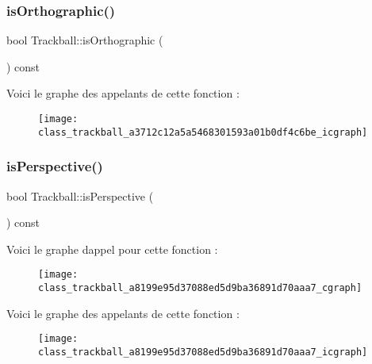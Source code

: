 \subsubsection{\texorpdfstring{is\+Orthographic()}{isOrthographic()}}
{\footnotesize\ttfamily bool Trackball\+::is\+Orthographic (\begin{DoxyParamCaption}{ }\end{DoxyParamCaption}) const}

Voici le graphe des appelants de cette fonction \+:
\nopagebreak
\begin{figure}[H]
\begin{center}
\leavevmode
\texttt{[image: class\_trackball\_a3712c12a5a5468301593a01b0df4c6be\_icgraph]}
\end{center}
\end{figure}
\mbox{\label{class_trackball_a8199e95d37088ed5d9ba36891d70aaa7}} 
\subsubsection{\texorpdfstring{is\+Perspective()}{isPerspective()}}
{\footnotesize\ttfamily bool Trackball\+::is\+Perspective (\begin{DoxyParamCaption}{ }\end{DoxyParamCaption}) const}

Voici le graphe d\textquotesingle{}appel pour cette fonction \+:
\nopagebreak
\begin{figure}[H]
\begin{center}
\leavevmode
\texttt{[image: class\_trackball\_a8199e95d37088ed5d9ba36891d70aaa7\_cgraph]}
\end{center}
\end{figure}
Voici le graphe des appelants de cette fonction \+:
\nopagebreak
\begin{figure}[H]
\begin{center}
\leavevmode
\texttt{[image: class\_trackball\_a8199e95d37088ed5d9ba36891d70aaa7\_icgraph]}
\end{center}
\end{figure}
\mbox{\label{class_trackball_a78fa30a8e6ffad74df3488aa3cc009c4}} 
